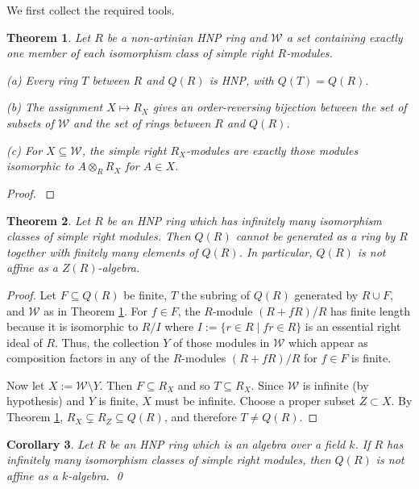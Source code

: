 \documentclass{conm-p-l}
\newtheorem{theorem}{Theorem}[section]
\newtheorem{cor}[theorem]{Corollary}
\theoremstyle{definition}
\theoremstyle{remark}
\numberwithin{equation}{section}
\newcommand \calW {{\mathcal{W}}}
\begin{document}
We first collect the required tools. 

\begin{theorem} \cite{Go74}
     \label{HNP.things}
Let $R$ be a non-artinian HNP ring and $\calW$ a set containing exactly one member of each isomorphism class of simple right $R$-modules.

{\rm(a)} Every ring $T$ between $R$ and $Q(R)$ is HNP, with $Q(T) = Q(R)$.

{\rm(b)} The assignment $X \mapsto R_X$ gives an order-reversing bijection between the set of subsets of $\calW$ and the set of rings between $R$ and $Q(R)$.

{\rm(c)} For $X \subseteq \calW$, the simple right $R_X$-modules are exactly those modules isomorphic to $A \otimes_R R_X$ for $A \in X$.
\end{theorem}

\begin{proof}
\cite[Proposition 2 and Theorems 3, 5]{Go74}
\end{proof}


\begin{theorem}  \label{inf.simples>inf.gen}
Let $R$ be an HNP ring which has infinitely many isomorphism classes of simple right modules.  Then $Q(R)$ cannot be generated as a ring by $R$ together with finitely many elements of $Q(R)$.  In particular, $Q(R)$ is not affine as a $Z(R)$-algebra.
\end{theorem}

\begin{proof}
Let $F \subseteq Q(R)$ be finite, $T$ the subring of $Q(R)$ generated by $R \cup F$, and $\calW$ as in Theorem \ref{HNP.things}.  For $f \in F$, the $R$-module $(R+fR)/R$ has finite length because it is isomorphic to $R/I$ where $I := \{ r \in R \mid fr \in R \}$ is an essential right ideal of $R$.  Thus, the collection $Y$ of those modules in $\calW$ which appear as composition factors in any of the $R$-modules $(R+fR)/R$ for $f\in F$ is finite.

Now let $X := \calW \setminus Y$.  Then $F \subseteq R_X$ and so $T \subseteq R_X$.  Since $\calW$ is infinite (by hypothesis) and $Y$ is finite, $X$ must be infinite.  Choose a proper subset $Z \subset X$.  By Theorem \ref{HNP.things}, $R_X \subsetneq R_Z \subseteq Q(R)$, and therefore $T \ne Q(R)$.
\end{proof}

\begin{cor}  \label{main.nonaff}
Let $R$ be an HNP ring which is an algebra over a field $k$.  If $R$ has infinitely many isomorphism classes of simple right modules, then $Q(R)$ is not affine as a $k$-algebra.
\qed\end{cor}
\end{document}

